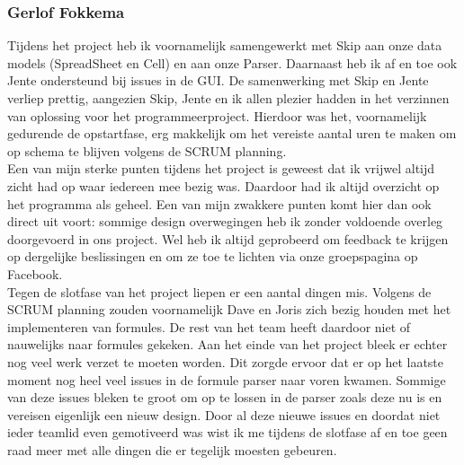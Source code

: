 \documentclass[a4paper,11pt,titlepage]{scrartcl}
\begin{document}
\subsubsection{Gerlof Fokkema}
Tijdens het project heb ik voornamelijk samengewerkt met Skip aan onze data models (SpreadSheet en Cell) en aan onze Parser. Daarnaast heb ik af en toe ook Jente ondersteund bij issues in de GUI. De samenwerking met Skip en Jente verliep prettig, aangezien Skip, Jente en ik allen plezier hadden in het verzinnen van oplossing voor het programmeerproject. Hierdoor was het, voornamelijk gedurende de opstartfase, erg makkelijk om het vereiste aantal uren te maken om op schema te blijven volgens de SCRUM planning.\\

Een van mijn sterke punten tijdens het project is geweest dat ik vrijwel altijd zicht had op waar iedereen mee bezig was. Daardoor had ik altijd overzicht op het programma als geheel. Een van mijn zwakkere punten komt hier dan ook direct uit voort: sommige design overwegingen heb ik zonder voldoende overleg doorgevoerd in ons project. Wel heb ik altijd geprobeerd om feedback te krijgen op dergelijke beslissingen en om ze toe te lichten via onze groepspagina op Facebook.\\

Tegen de slotfase van het project liepen er een aantal dingen mis. Volgens de SCRUM planning zouden voornamelijk Dave en Joris zich bezig houden met het implementeren van formules. De rest van het team heeft daardoor niet of nauwelijks naar formules gekeken. Aan het einde van het project bleek er echter nog veel werk verzet te moeten worden. Dit zorgde ervoor dat er op het laatste moment nog heel veel issues in de formule parser naar voren kwamen. Sommige van deze issues bleken te groot om op te lossen in de parser zoals deze nu is en vereisen eigenlijk een nieuw design. Door al deze nieuwe issues en doordat niet ieder teamlid even gemotiveerd was wist ik me tijdens de slotfase af en toe geen raad meer met alle dingen die er tegelijk moesten gebeuren.
\end{document}

